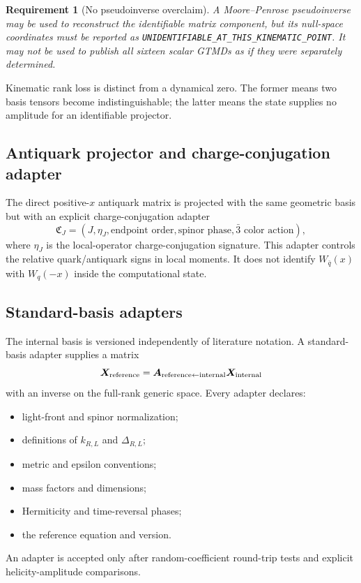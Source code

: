 \documentclass[11pt]{article}
\newtheorem{requirement}[definition]{Requirement}
\begin{document}
\begin{requirement}[No pseudoinverse overclaim]
\label{req:no-pseudoinverse-overclaim}
A Moore--Penrose pseudoinverse may be used to reconstruct the identifiable
matrix component, but its null-space coordinates must be reported as
\texttt{UNIDENTIFIABLE\_AT\_THIS\_KINEMATIC\_POINT}.  It may not be used to
publish all sixteen scalar GTMDs as if they were separately determined.
\end{requirement}

Kinematic rank loss is distinct from a dynamical zero.  The former means two
basis tensors become indistinguishable; the latter means the state supplies no
amplitude for an identifiable projector.

\subsection{Antiquark projector and charge-conjugation adapter}

The direct positive-\(x\) antiquark matrix is projected with the same geometric
basis but with an explicit charge-conjugation adapter
\begin{equation}
 \mathfrak C_J=
 \left(
 J,\eta_J,\text{endpoint order},\text{spinor phase},
 \bar3\text{ color action}
 \right),
 \label{eq:charge-conjugation-adapter}
\end{equation}
where \(\eta_J\) is the local-operator charge-conjugation signature.  This
adapter controls the relative quark/antiquark signs in local moments.  It does
not identify \(W_{\bar q}(x)\) with \(W_q(-x)\) inside the computational state.

\subsection{Standard-basis adapters}

The internal basis is versioned independently of literature notation.  A
standard-basis adapter supplies a matrix
\begin{equation}
 \bm X_{\rm reference}
 =\bm A_{\rm reference\leftarrow internal}\bm X_{\rm internal}
 \label{eq:reference-adapter}
\end{equation}
with an inverse on the full-rank generic space.  Every adapter declares:
\begin{itemize}
\item light-front and spinor normalization;
\item definitions of \(k_{R,L}\) and \(\Delta_{R,L}\);
\item metric and epsilon conventions;
\item mass factors and dimensions;
\item Hermiticity and time-reversal phases;
\item the reference equation and version.
\end{itemize}
An adapter is accepted only after random-coefficient round-trip tests and
explicit helicity-amplitude comparisons.
\end{document}
